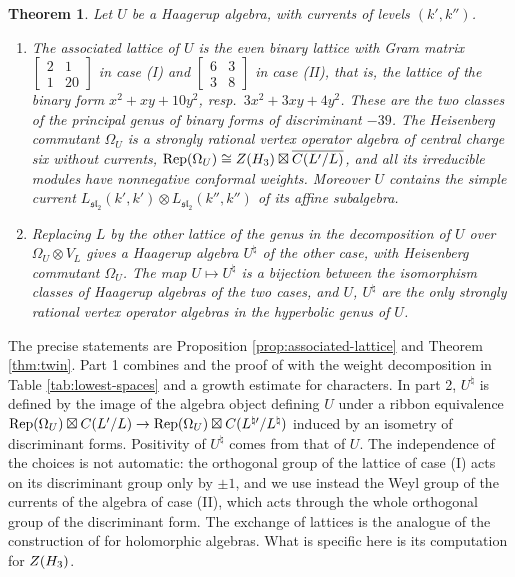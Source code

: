 \documentclass[leqno]{article}
\let\cal\relax
\newcommand{\cal}{\mathcal}
\newcommand{\ot}{\otimes}
\DeclareMathOperator{\Rep}{Rep}
\newtheorem{thm}{Theorem}[section]
\numberwithin{equation}{section}
\begin{document}
\begin{thm}
\label{thm:intro-genus}
Let $U$ be a Haagerup algebra, with currents of levels $(k',k'')$.
\begin{enumerate}
\item The associated lattice of $U$ is the even binary lattice with Gram matrix $\left[\begin{smallmatrix}2&1\\1&20\end{smallmatrix}\right]$ in case (I) and $\left[\begin{smallmatrix}6&3\\3&8\end{smallmatrix}\right]$ in case (II), that is, the lattice of the binary form $x^2+xy+10y^2$, resp.\ $3x^2+3xy+4y^2$. These are the two classes of the principal genus of binary forms of discriminant $-39$. The Heisenberg commutant $\Omega_U$ is a strongly rational vertex operator algebra of central charge six without currents, $\Rep(\Omega_U) \cong Z(\cal H_3) \boxtimes \overline{\cal C(L'/L)}$, and all its irreducible modules have nonnegative conformal weights. Moreover $U$ contains the simple current $L_{\mathfrak{sl}_2}(k',k') \ot L_{\mathfrak{sl}_2}(k'',k'')$ of its affine subalgebra.
\item Replacing $L$ by the other lattice of the genus in the decomposition of $U$ over $\Omega_U \ot V_L$ gives a Haagerup algebra $U^\natural$ of the other case, with Heisenberg commutant $\Omega_U$. The map $U \mapsto U^\natural$ is a bijection between the isomorphism classes of Haagerup algebras of the two cases, and $U$, $U^\natural$ are the only strongly rational vertex operator algebras in the hyperbolic genus of $U$.
\end{enumerate}
\end{thm}

The precise statements are Proposition \ref{prop:associated-lattice} and Theorem \ref{thm:twin}. Part 1 combines \cite[Proposition 2.14]{MoR24a} and the proof of \cite[Corollary 4.10]{MoR24a} with the weight decomposition in Table \ref{tab:lowest-spaces} and a growth estimate for characters. In part 2, $U^\natural$ is defined by the image of the algebra object defining $U$ under a ribbon equivalence $\Rep(\Omega_U) \boxtimes \cal C(L'/L) \to \Rep(\Omega_U) \boxtimes \cal C(L^{\natural\prime}/L^\natural)$ induced by an isometry of discriminant forms. Positivity of $U^\natural$ comes from that of $U$. The independence of the choices is not automatic: the orthogonal group of the lattice of case (I) acts on its discriminant group only by $\pm1$, and we use instead the Weyl group of the currents of the algebra of case (II), which acts through the whole orthogonal group of the discriminant form. The exchange of lattices is the analogue of the construction of \cite[Proposition 5.3]{MoR24a} for holomorphic algebras. What is specific here is its computation for $Z(\cal H_3)$.
\end{document}
